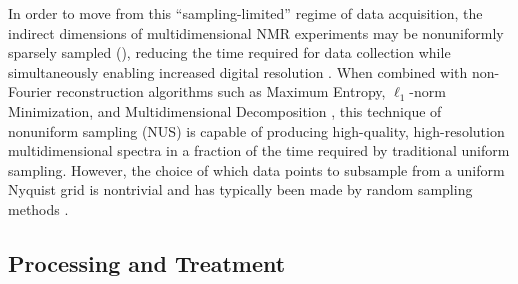 \begin{doublespace}
In order to move from this ``sampling-limited'' regime of data acquisition,
the indirect dimensions of multidimensional NMR experiments may be nonuniformly
sparsely sampled (), reducing the time required for
data collection while simultaneously enabling increased digital
resolution \cite{rovnyak:jmr2004}. When combined with non-Fourier
reconstruction algorithms such as Maximum Entropy, $\ell_1$-norm Minimization,
and Multidimensional Decomposition \cite{mobli:pnmrs2014}, this technique
of nonuniform sampling (NUS) is capable of producing high-quality,
high-resolution multidimensional spectra in a fraction of the time
required by traditional uniform sampling. However, the choice of which data
points to subsample from a uniform Nyquist grid is nontrivial and has typically
been made by random sampling methods
\cite{hoch:jmr2008,maciejewski:jmr2009}.
\end{doublespace}

\subsection{Processing and Treatment}

